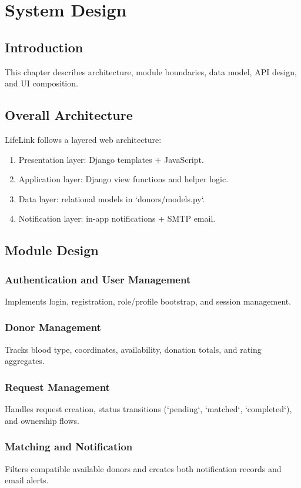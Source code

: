 \documentclass[12pt,a4paper]{report}
\begin{document}
\chapter{System Design}
\section{Introduction}
This chapter describes architecture, module boundaries, data model, API design, and UI composition.

\section{Overall Architecture}
LifeLink follows a layered web architecture:
\begin{enumerate}[leftmargin=1.5em]
\item Presentation layer: Django templates + JavaScript.
\item Application layer: Django view functions and helper logic.
\item Data layer: relational models in `donors/models.py`.
\item Notification layer: in-app notifications + SMTP email.
\end{enumerate}

\section{Module Design}
\subsection{Authentication and User Management}
Implements login, registration, role/profile bootstrap, and session management.

\subsection{Donor Management}
Tracks blood type, coordinates, availability, donation totals, and rating aggregates.

\subsection{Request Management}
Handles request creation, status transitions (`pending`, `matched`, `completed`), and ownership flows.

\subsection{Matching and Notification}
Filters compatible available donors and creates both notification records and email alerts.
\end{document}
